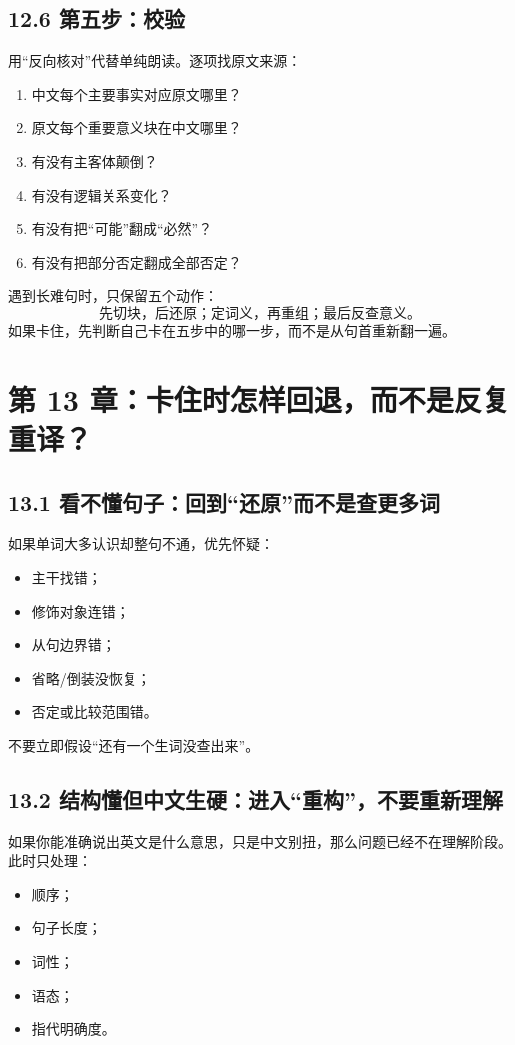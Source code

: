 \documentclass[11pt,a4paper]{ctexart}
\begin{document}
\subsection{12.6 第五步：校验}
用“反向核对”代替单纯朗读。逐项找原文来源：
\begin{enumerate}
  \item 中文每个主要事实对应原文哪里？
  \item 原文每个重要意义块在中文哪里？
  \item 有没有主客体颠倒？
  \item 有没有逻辑关系变化？
  \item 有没有把“可能”翻成“必然”？
  \item 有没有把部分否定翻成全部否定？
\end{enumerate}

\begin{exam}[考场压缩口令]
遇到长难句时，只保留五个动作：
\[
\boxed{\text{先切块，后还原；定词义，再重组；最后反查意义。}}
\]
如果卡住，先判断自己卡在五步中的哪一步，而不是从句首重新翻一遍。
\end{exam}

\section{第 13 章：卡住时怎样回退，而不是反复重译？}

\subsection{13.1 看不懂句子：回到“还原”而不是查更多词}
如果单词大多认识却整句不通，优先怀疑：
\begin{itemize}
  \item 主干找错；
  \item 修饰对象连错；
  \item 从句边界错；
  \item 省略/倒装没恢复；
  \item 否定或比较范围错。
\end{itemize}
不要立即假设“还有一个生词没查出来”。

\subsection{13.2 结构懂但中文生硬：进入“重构”，不要重新理解}
如果你能准确说出英文是什么意思，只是中文别扭，那么问题已经不在理解阶段。此时只处理：
\begin{itemize}
  \item 顺序；
  \item 句子长度；
  \item 词性；
  \item 语态；
  \item 指代明确度。
\end{itemize}
\end{document}
